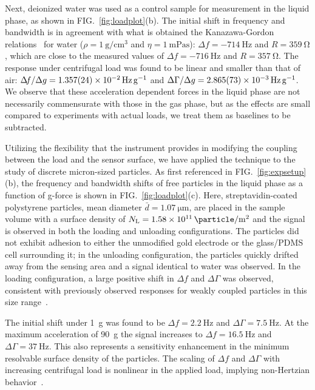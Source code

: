 \documentclass[floatfix,superscriptaddress,a4paper,twocolumn]{revtex4-1}
\newcommand{\Figure}[1]{FIG.~\ref{#1}}
\newcommand{\df}{\Delta\!f}
\newcommand{\dg}{\Delta\Gamma}
\begin{document}
Next, deionized water was used as a control sample for measurement in the
liquid phase, as shown in \Figure{fig:loadplot}(b).  The initial shift in
frequency and bandwidth is in agreement with what is obtained the Kanazawa-Gordon
relations~\cite{kanazawa1985frequency} for water
($\rho=\SI{1}{\gram\per\centi\meter\cubed}$ and
$\eta=\SI{1}{\milli\pascal\second}$): $\df = \SI{-714}{\hertz}$ and
$R=\SI{359}{\ohm}$, which are close to the measured values of $\df =
\SI{-716}{\hertz}$ and $R=\SI{357}{\ohm}$.  The response under centrifugal
load was found to be linear and smaller than that of air: $\df/\Delta g=
\SI{1.357+-0.024e-2}{\hertz \per\g}$ and $\dg/\Delta g=
\SI{2.865+-0.073e-3}{\hertz\per\g}$.  We observe that these acceleration
dependent forces in the liquid phase are not necessarily commensurate with
those in the gas phase, but as the effects are small compared to
experiments with actual loads, we treat them as baselines to be
subtracted.

Utilizing the flexibility that the instrument provides in modifying the
coupling between the load and the sensor surface, we have applied the
technique to the study of discrete micron-sized particles.  As first
referenced in \Figure{fig:expsetup}(b), the frequency and bandwidth shifts
of free particles in the liquid phase as a function of g-force is shown in
\Figure{fig:loadplot}(c).  Here, streptavidin-coated polystyrene particles,
mean diameter $\bar{d}=\SI{1.07}{\micro\meter}$, are placed in the sample volume with
a surface density of
$N_\mathrm{L}=\SI{1.58e11}{\particle\per\meter\squared}$ and the signal is
observed in both the loading and unloading configurations.
The particles
did not exhibit adhesion to either the unmodified gold electrode or the
glass/PDMS cell surrounding it; in the unloading configuration, the particles
quickly drifted away from the sensing area and a signal identical to water
was observed.  In the loading configuration, a large positive
shift in $\df$ and $\dg$ was observed, consistent with
previously observed responses for weakly coupled particles in this size
range~\cite{johannsman2007contacts}.

The initial shift under \SI{1}{g} was found to be $\df=
\SI{2.2}{\hertz}$ and $\dg=\SI{7.5}{\hertz}$.  At the maximum acceleration of \SI{90}{g} the
signal increases to $\df = \SI{16.5}{\hertz}$ and $\dg=\SI{37}{\hertz}$. This also
represents a sensitivity enhancement in the minimum resolvable surface
density of the particles.  The scaling of $\df$ and $\dg$ with increasing
centrifugal load is nonlinear in the applied load, implying non-Hertzian
behavior~\cite{borovsky2001measuring}.
\end{document}
